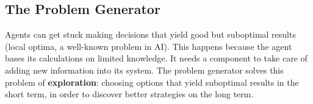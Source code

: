 \subsection{The Problem Generator}
Agents can get stuck making decisions that yield good but suboptimal results (local optima, a well-known problem in AI).
This happens because the agent bases its calculations on limited knowledge.
It needs a component to take care of adding new information into its system.
The problem generator solves this problem of \textbf{exploration}:
choosing options that yield suboptimal results in the short term, in order to discover better strategies on the long term.
